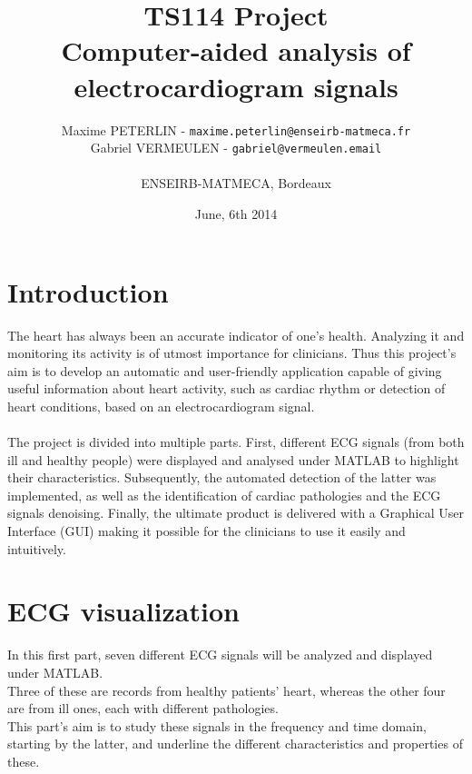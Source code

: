 \documentclass[11pt]{article}
\title{\textbf{TS114 Project}\\Computer-aided analysis of electrocardiogram signals}
\author{Maxime PETERLIN - \texttt{maxime.peterlin@enseirb-matmeca.fr}\\
Gabriel VERMEULEN - \texttt{gabriel@vermeulen.email} \\\\{ENSEIRB-MATMECA, Bordeaux}}
\date{June, 6th 2014}
\begin{document}
\maketitle
\tableofcontents

\newpage

\section{Introduction}
	The heart has always been an accurate indicator of one's health. Analyzing it and monitoring its activity is of utmost importance for clinicians. Thus this project's aim is to develop an automatic and user-friendly application capable of giving useful information about heart activity, such as cardiac rhythm or detection of heart conditions, based on an electrocardiogram signal.\\\\
	The project is divided into multiple parts. First, different ECG signals (from both ill and healthy people) were displayed and analysed under MATLAB to highlight their characteristics. Subsequently, the automated detection of the latter was implemented, as well as the identification of cardiac pathologies and the ECG signals denoising. Finally, the ultimate product is delivered with a Graphical User Interface (GUI) making it possible for the clinicians to use it easily and intuitively.\\


\section{ECG visualization}
	In this first part, seven different ECG signals will be analyzed and displayed under MATLAB. \\Three of these are records from healthy patients' heart, whereas the other four are from ill ones, each with different pathologies.\\
	This part's aim is to study these signals in the frequency and time domain, starting by the latter, and underline the different characteristics and properties of these.
\end{document}
